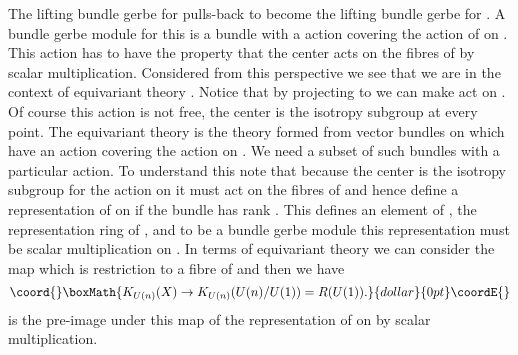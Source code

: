 \documentclass[a4paper,reqno]{amsart}
\theoremstyle{plain}
\theoremstyle{definition}
\theoremstyle{remark}
\numberwithin{equation}{section}
\numberwithin{figure}{section}
\providecommand{\CC}{{\mathbb C}}
\providecommand{\<}{\langle}
\renewcommand{\>}{\rangle}
\begin{document}
The lifting bundle gerbe for \coordHE{} pulls-back to become the lifting
bundle gerbe for \coordHE{}.  A bundle gerbe module for
this is a bundle \coordHE{} with a \coordHE{} action covering the
action of \coordHE{} on \coordHE{}.  This \coordHE{} action has to have the
property that the center \coordHE{} acts on the fibres of
\coordHE{} by scalar multiplication.  Considered from this perspective we see that
we are in  the context
of equivariant \coordHE{} theory \cite{Seg1}. Notice that by projecting to
\coordHE{} we can make
\coordHE{} act on
\coordHE{}. Of course this action is
not   free, the center \coordHE{} is the isotropy subgroup
at every point.   The equivariant \coordHE{} theory
\coordHE{} is the \coordHE{} theory formed from vector bundles
on \coordHE{} which have an \coordHE{} action covering the action on \coordHE{}.  We
need a subset
of such bundles with a particular action.  To understand this note that
because the center \coordHE{} is the isotropy subgroup for the \coordHE{}
action on \coordHE{} it must act on the fibres of \coordHE{} and hence define a
representation
of \coordHE{} on \myHighlight{$\CC^r$}\coordHE{} if the bundle \coordHE{} has rank \coordHE{}.  This defines an
element of
\coordHE{}, the representation ring  of \coordHE{}, and to be a bundle gerbe module
this representation must be scalar multiplication on \myHighlight{$\CC^r$}\coordHE{}.  In terms
of equivariant \coordHE{} theory we can consider the map which is
restriction to a fibre of \coordHE{} and then we have
$$\coord{}\boxMath{
K_{U(n)}(X) \to K_{U(n)}(U(n)/U(1)) = R(U(1)).
}{dollar}{0pt}\coordE{}$$  \coordHE{} is the pre-image under this map of the representation
of \coordHE{} on \myHighlight{$\CC^n$}\coordHE{} by scalar multiplication.
\end{document}

